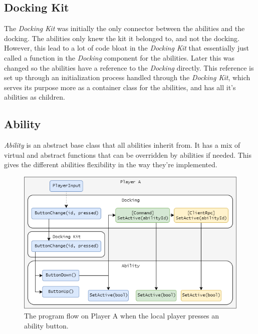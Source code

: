 \subsection{Docking Kit}
The \emph{Docking Kit} was initially the only connector between the abilities and the docking. The abilities only knew the kit it belonged to, and not the docking. However, this lead to a lot of code bloat in the \emph{Docking Kit} that essentially just called a function in the \emph{Docking} component for the abilities. Later this was changed so the abilities have a reference to the \emph{Docking} directly. This reference is set up through an initialization process handled through the \emph{Docking Kit}, which serves its purpose more as a container class for the abilities, and has all it's abilities as children.

\subsection{Ability}
\emph{Ability} is an abstract base class that all abilities inherit from. It has a mix of virtual and abstract functions that can be overridden by abilities if needed. This gives the different abilities flexibility in the way they're implemented. 

\begin{figure}[tbph]
  \centering
  \includegraphics[width=.9\textwidth]{images/CommandSetActive}
  \caption[Program flow on ability button pressed]{The program flow on Player A when the local player presses an ability button.}
  \label{fig:commandSetActive}
\end{figure}

